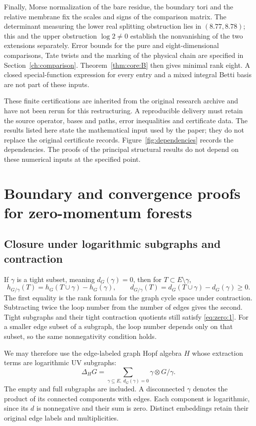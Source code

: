 \documentclass[11pt,a4paper,oneside]{article}
\theoremstyle{plain}
\theoremstyle{definition}
\theoremstyle{remark}
\numberwithin{equation}{section}
\begin{document}
Finally, Morse normalization of the bare residue, the boundary tori and the relative membrane fix the scales and signs of the comparison matrix. The determinant measuring the lower real splitting obstruction lies in $(8.77,8.78)$; this and the upper obstruction $\log2\ne0$ establish the nonvanishing of the two extensions separately. Error bounds for the pure and eight-dimensional comparisons, Tate twists and the marking of the physical chain are specified in Section~\ref{ch:comparison}. Theorem~\ref{thm:core:B} then gives minimal rank eight. A closed special-function expression for every entry and a mixed integral Betti basis are not part of these inputs.

These finite certifications are inherited from the original research archive and have not been rerun for this restructuring. A reproducible delivery must retain the source operator, bases and paths, error inequalities and certificate data. The results listed here state the mathematical input used by the paper; they do not replace the original certificate records. Figure~\ref{fig:dependencies} records the dependencies. The proofs of the principal structural results do not depend on these numerical inputs at the specified point.


\section{Boundary and convergence proofs for zero-momentum forests}\label{app:zero-proof}
\begingroup
\subsection{Closure under logarithmic subgraphs and contraction}\label{sec:zero:2}
If \(\gamma\) is a tight subset, meaning \(d_G(\gamma)=0\), then for \(T\subset E\setminus\gamma\),
\begin{equation}
h_{G/\gamma}(T)=h_G(T\cup\gamma)-h_G(\gamma),\qquad
 d_{G/\gamma}(T)=d_G(T\cup\gamma)-d_G(\gamma)\geq0.     \label{eq:zero:3}
\end{equation}
The first equality is the rank formula for the graph cycle space under contraction. Subtracting twice the loop number from the number of edges gives the second. Tight subgraphs and their tight contraction quotients still satisfy \eqref{eq:zero:1}. For a smaller edge subset of a subgraph, the loop number depends only on that subset, so the same nonnegativity condition holds.

We may therefore use the edge-labeled graph Hopf algebra $H$ whose extraction terms are logarithmic UV subgraphs:
\begin{equation}
\Delta_H G=\sum_{\gamma\subseteq E,\ d_G(\gamma)=0}
                         \gamma\otimes G/\gamma.             \label{eq:zero:4}
\end{equation}
The empty and full subgraphs are included. A disconnected \(\gamma\) denotes the product of its connected components with edges. Each component is logarithmic, since its $d$ is nonnegative and their sum is zero. Distinct embeddings retain their original edge labels and multiplicities.
\end{document}

